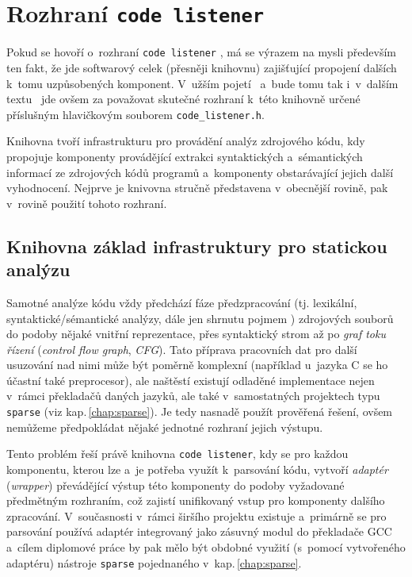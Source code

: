 \chapter{Rozhraní \texttt{code listener}}
\label{chap:code-listener}

Pokud se hovoří o~rozhraní \texttt{code listener} \cite{web:FITVUTBR:VeriFIT:CodeListener},
má se výrazem  na mysli především ten fakt, že jde softwarový
celek (přesněji knihovnu) zajišťující propojení dalších k~tomu uzpůsobených
komponent. V~užším pojetí \ndash\ a~bude tomu tak i~v~dalším textu \ndash\ jde ovšem
za  považovat skutečné rozhraní k~této knihovně určené
příslušným hlavičkovým souborem \texttt{code\_listener.h}.

Knihovna tvoří infrastrukturu pro provádění analýz zdrojového kódu, kdy
propojuje komponenty provádějící extrakci syntaktických a~sémantických
informací ze zdrojových kódů programů a~komponenty obstarávající jejich
další vyhodnocení. Nejprve je knivovna stručně představena v~obecnější rovině,
pak v~rovině použití tohoto rozhraní.

\section{Knihovna základ infrastruktury pro statickou analýzu}

Samotné analýze kódu vždy předchází fáze předzpracování (tj. lexikální,
syntaktické/sémantické analýzy, dále jen shrnutu pojmem )
zdrojových souborů do podoby nějaké vnitřní reprezentace, přes syntaktický
strom až po \emph{graf toku řízení} (\emph{control flow graph}, \emph{CFG}).
Tato příprava pracovních dat pro další usuzování nad nimi může být
poměrně komplexní (například u~jazyka C se ho účastní také preprocesor),
ale naštěstí existují odladěné implementace nejen v~rámci překladačů
daných jazyků, ale také v~samostatných projektech typu \texttt{sparse}
(viz kap.\,\ref{chap:sparse}). Je tedy nasnadě použít prověřená řešení, ovšem
nemůžeme předpokládat nějaké jednotné rozhraní jejich výstupu.

Tento problém řeší právě knihovna \texttt{code listener}, kdy se pro každou
komponentu, kterou lze a~je potřeba využít k~parsování kódu, vytvoří
\emph{adaptér} (\emph{wrapper}) převádějící výstup této komponenty
do podoby vyžadované předmětným rozhraním, což zajistí unifikovaný
vstup pro komponenty dalšího zpracování. V~současnosti v~rámci širšího
projektu existuje a~primárně se pro parsování používá adaptér integrovaný
jako zásuvný modul do překladače GCC a~cílem diplomové práce
by pak mělo být obdobné využití (s~pomocí vytvořeného adaptéru) nástroje
\texttt{sparse} pojednaného v~kap.\,\ref{chap:sparse}.


